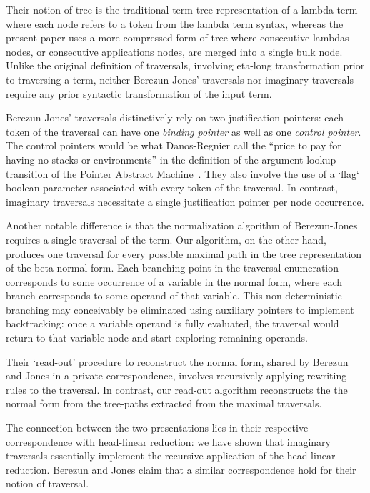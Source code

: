 \documentclass{elsarticle}
\theoremstyle{plain}
\theoremstyle{definition}
\theoremstyle{remark}
\begin{document}
Their notion of tree is the traditional term tree representation of a lambda term where each node refers to a token from the lambda term syntax, whereas the present paper uses a more compressed form of tree where consecutive lambdas nodes, or consecutive applications nodes, are merged into a single bulk node. Unlike the original definition of traversals, involving eta-long transformation prior to traversing a term, neither Berezun-Jones' traversals nor imaginary traversals require any prior syntactic transformation of the input term.

Berezun-Jones' traversals distinctively rely on two justification pointers: each token of the traversal can have one \emph{binding pointer} as well as one \emph{control pointer}. The control pointers would be what Danos-Regnier call the ``price to pay for having no stacks or environments'' in the definition of the argument lookup transition of the Pointer Abstract Machine~\cite{danos-head}. They also involve the use of a `flag` boolean parameter associated with every token of the traversal.
In contrast, imaginary traversals necessitate a single justification pointer per node occurrence.

Another notable difference is that the normalization algorithm of Berezun-Jones requires a single traversal of the term. Our algorithm, on the other hand, produces one traversal for every possible maximal path in the tree representation of the beta-normal form. Each branching point in the traversal enumeration corresponds to some occurrence of a variable in the normal form, where each branch corresponds to some operand of that variable. This non-deterministic branching may conceivably be eliminated using auxiliary pointers to implement backtracking: once a variable operand is fully evaluated, the traversal would return to that variable node and start exploring remaining operands.

Their `read-out' procedure to reconstruct the normal form, shared by Berezun and Jones in a private correspondence, involves recursively applying rewriting rules to the traversal. In contrast, our read-out algorithm reconstructs the the normal form from the tree-paths extracted from the maximal traversals.

The connection between the two presentations lies in their respective correspondence with head-linear reduction: we have shown that imaginary traversals essentially implement the recursive application of the head-linear reduction. Berezun and Jones claim that a similar correspondence hold for their notion of traversal.
\end{document}
